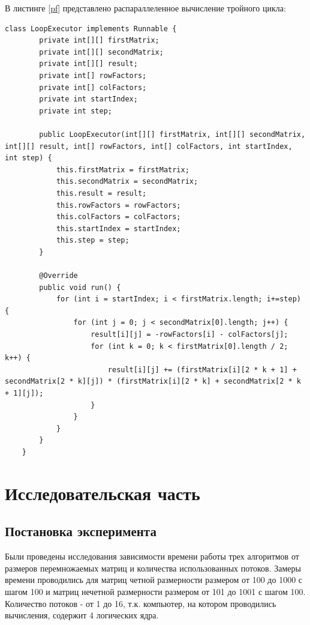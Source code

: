 \documentclass[12pt]{report}
\begin{document}
В листинге \ref{pf} представлено распараллеленное вычисление тройного цикла:

	\begin{lstlisting}[label=pf,caption=Распараллеленный тройной цикл]
class LoopExecutor implements Runnable {
        private int[][] firstMatrix;
        private int[][] secondMatrix;
        private int[][] result;
        private int[] rowFactors;
        private int[] colFactors;
        private int startIndex;
        private int step;

        public LoopExecutor(int[][] firstMatrix, int[][] secondMatrix, int[][] result, int[] rowFactors, int[] colFactors, int startIndex, int step) {
            this.firstMatrix = firstMatrix;
            this.secondMatrix = secondMatrix;
            this.result = result;
            this.rowFactors = rowFactors;
            this.colFactors = colFactors;
            this.startIndex = startIndex;
            this.step = step;
        }

        @Override
        public void run() {
            for (int i = startIndex; i < firstMatrix.length; i+=step) {
                for (int j = 0; j < secondMatrix[0].length; j++) {
                    result[i][j] = -rowFactors[i] - colFactors[j];
                    for (int k = 0; k < firstMatrix[0].length / 2; k++) {
                        result[i][j] += (firstMatrix[i][2 * k + 1] + secondMatrix[2 * k][j]) * (firstMatrix[i][2 * k] + secondMatrix[2 * k + 1][j]);
                    }
                }
            }
        }
    }
\end{lstlisting}



\chapter{Исследовательская часть}

\section{Постановка эксперимента}

Были проведены исследования зависимости времени работы трех алгоритмов от размеров перемножаемых матриц и количества использованных потоков. Замеры времени проводились для матриц четной размерности размером от 100 до 1000 с шагом 100 и матриц нечетной размерности размером от 101 до 1001 с шагом 100. Количество потоков - от 1 до 16, т.к. компьютер, на котором проводились вычисления, содержит 4 логических ядра.\\
	
\end{document}
